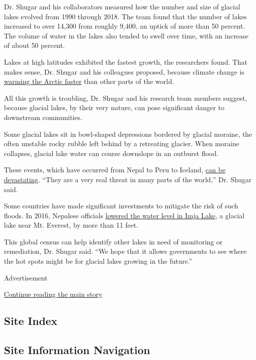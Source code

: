 Dr. Shugar and his collaborators measured how the number and size of
glacial lakes evolved from 1990 through 2018. The team found that the
number of lakes increased to over 14,300 from roughly 9,400, an uptick
of more than 50 percent. The volume of water in the lakes also tended to
swell over time, with an increase of about 50 percent.

Lakes at high latitudes exhibited the fastest growth, the researchers
found. That makes sense, Dr. Shugar and his colleagues proposed, because
climate change is
\href{https://www.nytimes3xbfgragh.onion/2018/12/11/climate/arctic-warming.html?searchResultPosition=1}{warming
the Arctic faster} than other parts of the world.

All this growth is troubling, Dr. Shugar and his research team members
suggest, because glacial lakes, by their very nature, can pose
significant danger to downstream communities.

Some glacial lakes sit in bowl-shaped depressions bordered by glacial
moraine, the often unstable rocky rubble left behind by a retreating
glacier. When moraine collapses, glacial lake water can course downslope
in an outburst flood.

These events, which have occurred from Nepal to Peru to Iceland,
\href{https://eos.org/features/the-dangers-of-glacial-lake-floods-pioneering-and-capitulation}{can
be devastating}. ``They are a very real threat in many parts of the
world,'' Dr. Shugar said.

Some countries have made significant investments to mitigate the risk of
such floods. In 2016, Nepalese officials
\href{https://kathmandupost.com/miscellaneous/2016/12/03/dammed}{lowered
the water level in Imja Lake}, a glacial lake near Mt. Everest, by more
than 11 feet.

This global census can help identify other lakes in need of monitoring
or remediation, Dr. Shugar said. ``We hope that it allows governments to
see where the hot spots might be for glacial lakes growing in the
future.''

Advertisement

\protect\hyperlink{after-bottom}{Continue reading the main story}

\hypertarget{site-index}{%
\subsection{Site Index}\label{site-index}}

\hypertarget{site-information-navigation}{%
\subsection{Site Information
Navigation}\label{site-information-navigation}}

